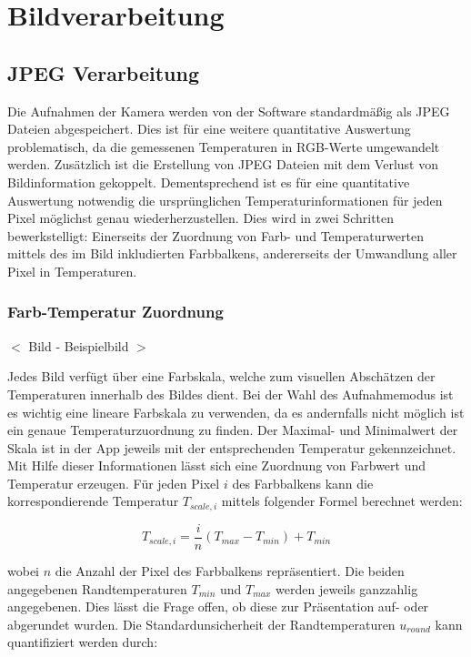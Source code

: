 \documentclass[10pt,a4paper,german]{article}
\begin{document}
\section{Bildverarbeitung}
\subsection{JPEG Verarbeitung}
Die Aufnahmen der Kamera werden von der Software standardmäßig als JPEG Dateien abgespeichert.
Dies ist für eine weitere quantitative Auswertung problematisch, da die gemessenen Temperaturen in RGB-Werte umgewandelt werden.
Zusätzlich ist die Erstellung von JPEG Dateien mit dem Verlust von Bildinformation gekoppelt. 
Dementsprechend ist es für eine quantitative Auswertung notwendig die ursprünglichen Temperaturinformationen für jeden Pixel möglichst genau wiederherzustellen.
Dies wird in zwei Schritten bewerkstelligt:
Einerseits der Zuordnung von Farb- und Temperaturwerten mittels des im Bild inkludierten Farbbalkens, andererseits der Umwandlung aller Pixel in Temperaturen.

\subsubsection{Farb-Temperatur Zuordnung}

\begin{center}
    $<$ Bild - Beispielbild $>$
\end{center}

Jedes Bild verfügt über eine Farbskala, welche zum visuellen Abschätzen der Temperaturen innerhalb des Bildes dient.
Bei der Wahl des Aufnahmemodus ist es wichtig eine lineare Farbskala zu verwenden, da es andernfalls nicht möglich ist ein genaue Temperaturzuordnung zu finden.
Der Maximal- und Minimalwert der Skala ist in der App jeweils mit der entsprechenden Temperatur gekennzeichnet.
Mit Hilfe dieser Informationen lässt sich eine Zuordnung von Farbwert und Temperatur erzeugen.
Für jeden Pixel $i$ des Farbbalkens kann die korrespondierende Temperatur $T_{scale,i}$ mittels folgender Formel berechnet werden:

\begin{equation}
    T_{scale,i} = \frac{i}{n} \left(T_{max} - T_{min}\right) + T_{min}
\end{equation}

wobei $n$ die Anzahl der Pixel des Farbbalkens repräsentiert.
Die beiden angegebenen Randtemperaturen $T_{min}$ und $T_{max}$ werden jeweils ganzzahlig angegebenen.
Dies lässt die Frage offen, ob diese zur Präsentation auf- oder abgerundet wurden.
Die Standardunsicherheit der Randtemperaturen $u_{round}$ kann quantifiziert werden durch:
\end{document}

